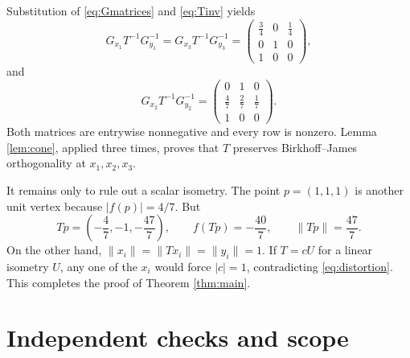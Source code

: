 \documentclass[11pt]{article}
\begin{document}
Substitution of \eqref{eq:Gmatrices} and \eqref{eq:Tinv} yields
\begin{equation}\label{eq:A13}
 G_{x_1}T^{-1}G_{y_1}^{-1}
 =G_{x_3}T^{-1}G_{y_3}^{-1}
 =\begin{pmatrix}
 \frac34&0&\frac14\\
 0&1&0\\
 1&0&0
 \end{pmatrix},
\end{equation}
and
\begin{equation}\label{eq:A2}
 G_{x_2}T^{-1}G_{y_2}^{-1}
 =\begin{pmatrix}
 0&1&0\\
 \frac47&\frac27&\frac17\\
 1&0&0
 \end{pmatrix}.
\end{equation}
Both matrices are entrywise nonnegative and every row is nonzero. Lemma
\ref{lem:cone}, applied three times, proves that $T$ preserves
Birkhoff--James orthogonality at $x_1,x_2,x_3$.

It remains only to rule out a scalar isometry. The point $p=(1,1,1)$ is
another unit vertex because $|f(p)|=4/7$. But
\begin{equation}\label{eq:distortion}
 Tp=\left(-\frac47,-1,-\frac{47}{7}\right),\qquad
 f(Tp)=-\frac{40}{7},\qquad
 \|Tp\|=\frac{47}{7}.
\end{equation}
On the other hand, $\|x_i\|=\|Tx_i\|=\|y_i\|=1$. If $T=cU$ for a linear
isometry $U$, any one of the $x_i$ would force $|c|=1$, contradicting
\eqref{eq:distortion}. This completes the proof of Theorem \ref{thm:main}.

\section{Independent checks and scope}
\end{document}
